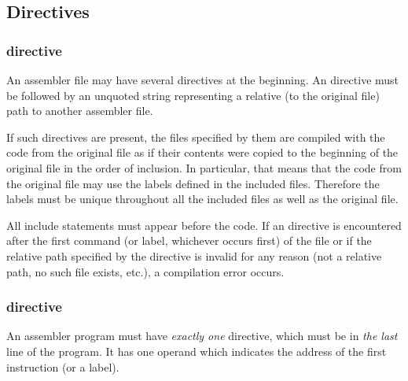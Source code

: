 \subsection{Directives}

\subsubsection{ directive}

\vspace{-0.2cm}

An assembler file may have several  directives at the beginning.
An  directive must be followed by an unquoted string
representing a relative (to the original file) path to another assembler file.

If such directives are present, the files specified by them are compiled with
the code from the original file as if their contents were copied to
the beginning of the original file in the order of inclusion.
In particular, that means that the code from the original file may use
the labels defined in the included files.
Therefore the labels must be unique throughout all the included files 
as well as the original file.

All include statements must appear before the code.
If an  directive is encountered after the first command
(or label, whichever occurs first) of the file or if the relative path
specified by the directive is invalid for any reason (not a relative path,
no such file exists, etc.), a compilation error occurs.

\vspace{-0.35cm}

\subsubsection{ directive}

\vspace{-0.2cm}

An assembler program must have \textit{exactly one}  directive,
which must be in \textit{the last} line of the program.
It has one operand which indicates the address of the first instruction
(or a label).
